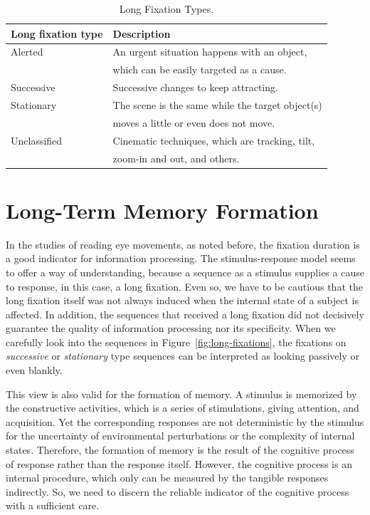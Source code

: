 \documentclass[oneside,master]{snueethesis}
\begin{document}
\begin{table}[htbp]
\begin{center} 
\caption{Long Fixation Types.} 
\label{tab:long-fixation-types} 
\vskip 0.12in
\begin{tabular}{lp{8cm}} 
\hline
Long fixation type    &  Description \\
\hline
Alerted         &   An urgent situation happens with an object, \\
                &   \hspace{5mm} which can be easily targeted as a cause.\\
Successive      &   Successive changes to keep attracting. \\
Stationary      &   The scene is the same while the target object(s) \\
                &   \hspace{5mm} moves a little or even does not move. \\
Unclassified    &   Cinematic techniques, which are tracking, tilt, \\
                &   \hspace{5mm} zoom-in and out, and others. \\
\hline
\end{tabular} 
\end{center} 
\end{table}



\chapter{Long-Term Memory Formation}

In the studies of reading eye movements, as noted before, the fixation duration is a good indicator for information processing. The stimulus-response model seems to offer a way of understanding, because a sequence as a stimulus supplies a cause to response, in this case, a long fixation. Even so, we have to be cautious that the long fixation itself was not always induced when the internal state of a subject is affected. In addition, the sequences that received a long fixation did not decisively guarantee the quality of information processing nor its specificity. When we carefully look into the sequences in Figure~\ref{fig:long-fixations}, the fixations on \textit{successive} or \textit{stationary} type sequences can be interpreted as looking passively or even blankly.

This view is also valid for the formation of memory. A stimulus is memorized by the constructive activities, which is a series of stimulations, giving attention, and acquisition. Yet the corresponding responses are not deterministic by the stimulus for the uncertainty of environmental perturbations or the complexity of internal states. Therefore, the formation of memory is the result of the cognitive process of response rather than the response itself. However, the cognitive process is an internal procedure, which only can be measured by the tangible responses indirectly. So, we need to discern the reliable indicator of the cognitive process with a sufficient care.
\end{document}
